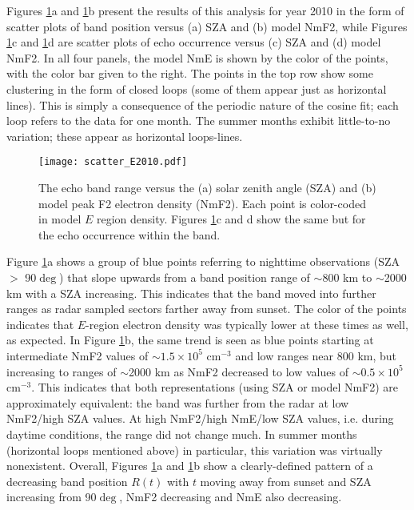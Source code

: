 Figures \ref{fig:scatter}a and \ref{fig:scatter}b present the results of this analysis for year 2010 in the form of scatter plots of band position versus (a) SZA and (b) model NmF2, while Figures \ref{fig:scatter}c and \ref{fig:scatter}d are scatter plots of echo occurrence versus (c) SZA and (d) model NmF2. In all four panels, the model NmE is shown by the color of the points, with the color bar given to the right. The points in the top row show some clustering in the form of closed loops (some of them appear just as horizontal lines). This is simply a consequence of the periodic nature of the cosine fit; each loop refers to the data for one month. The summer months exhibit little-to-no variation; these appear as horizontal loops-lines.

\begin{figure}
\texttt{[image: scatter\_E2010.pdf]}
\caption{The echo band range versus the (a) solar zenith angle (SZA) and (b) model peak F2 electron density (NmF2). Each point is color-coded in model \(E\) region density. Figures \ref{fig:scatter}c and d show the same but for the  echo occurrence within the band.}
\label{fig:scatter}
\end{figure}

Figure \ref{fig:scatter}a shows a group of blue points referring to nighttime observations (SZA \(>\) 90\(\deg\)) that slope upwards from a band position range of \(\sim\)800 km to \(\sim\)2000 km with a SZA increasing. This indicates that the band moved into further ranges as radar sampled sectors farther away from sunset. The color of the points indicates that \(E\)-region electron density was typically lower at these times as well, as expected. In Figure \ref{fig:scatter}b, the same trend is seen as blue points starting at intermediate NmF2 values of \(\sim1.5 \times 10^5\) cm\(^{-3}\) and low ranges near 800 km, but increasing to ranges of \(\sim\)2000 km as NmF2 decreased to low values of \(\sim0.5 \times 10^5\) cm\(^{-3}\). This indicates that both representations (using SZA or model NmF2) are approximately equivalent: the band was further from the radar at low NmF2/high SZA values. At high NmF2/high NmE/low SZA values, i.e. during daytime conditions, the range did not change much. In summer months (horizontal loops mentioned above) in particular, this variation was virtually nonexistent. Overall, Figures \ref{fig:scatter}a and \ref{fig:scatter}b show a clearly-defined pattern of a decreasing band position \(R\left(t\right)\) with \(t\) moving away from sunset and SZA increasing from 90\(\deg\), NmF2 decreasing and NmE also decreasing.

